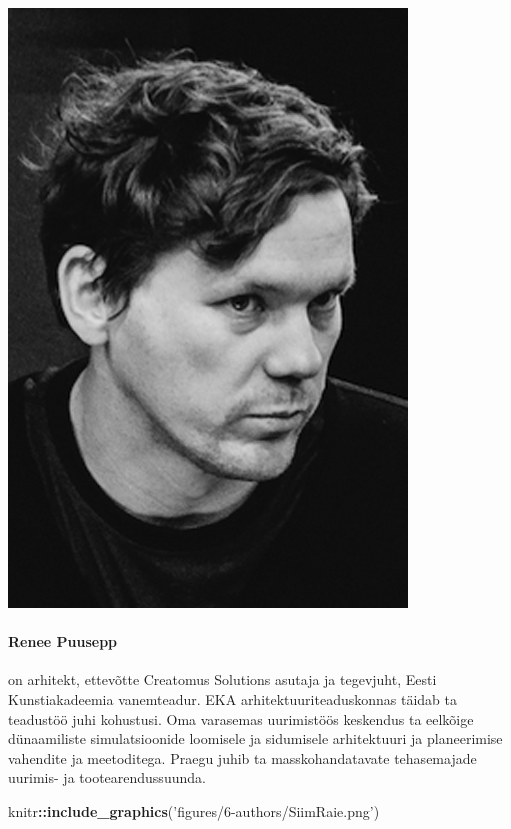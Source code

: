 \documentclass[estonian,]{article}
\newenvironment{Shaded}{\begin{snugshade}}{\end{snugshade}}
\newcommand{\KeywordTok}[1]{\textcolor[rgb]{0.13,0.29,0.53}{\textbf{#1}}}
\newcommand{\NormalTok}[1]{#1}
\newcommand{\OperatorTok}[1]{\textcolor[rgb]{0.81,0.36,0.00}{\textbf{#1}}}
\newcommand{\StringTok}[1]{\textcolor[rgb]{0.31,0.60,0.02}{#1}}
\let\oldparagraph\paragraph
\renewcommand{\paragraph}[1]{\oldparagraph{#1}\mbox{}}
\begin{document}
\begin{flushleft}\includegraphics[width=0.5\linewidth]{figures/6-authors/ReneePuusepp} \end{flushleft}

\hypertarget{renee-puusepp}{%
\paragraph{Renee Puusepp}\label{renee-puusepp}}

on arhitekt, ettevõtte Creatomus Solutions asutaja ja tegevjuht, Eesti Kunstiakadeemia vanemteadur. EKA arhitektuuriteaduskonnas täidab ta teadustöö juhi kohustusi. Oma varasemas uurimistöös keskendus ta eelkõige dünaamiliste simulatsioonide loomisele ja sidumisele arhitektuuri ja planeerimise vahendite ja meetoditega. Praegu juhib ta masskohandatavate tehasemajade uurimis- ja tootearendussuunda.

\begin{Shaded}
\begin{Highlighting}[]
\NormalTok{knitr}\OperatorTok{::}\KeywordTok{include_graphics}\NormalTok{(}\StringTok{'figures/6-authors/SiimRaie.png'}\NormalTok{)}
\end{Highlighting}
\end{Shaded}
\end{document}

